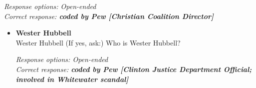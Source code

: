 \documentclass[12pt, letterpaper]{article}
\begin{document}
\begin{itemize}
{\begin{itemize}
\textit{Response options: Open-ended} \\
\textit{Correct response: \textbf{coded by Pew [Christian Coalition Director]}}
\end{itemize}

   \begin{itemize}
\item \textbf{Wester Hubbell} \\
Wester Hubbell (If yes, ask:) Who is Wester Hubbell?

\textit{Response options: Open-ended} \\
\textit{Correct response: \textbf{coded by Pew [Clinton Justice Department Official; involved in Whitewater scandal]}}
\end{itemize}}
\end{itemize}
\end{document}
